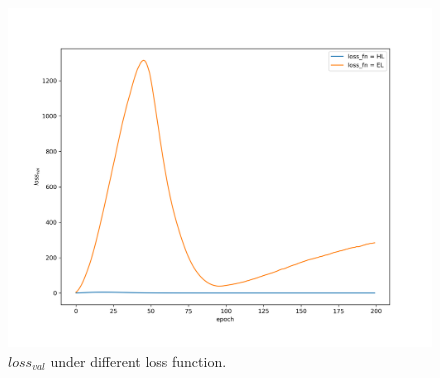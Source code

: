 \documentclass[journal, a4paper]{IEEEtran}
\begin{document}
\begin{figure}[!hbt]
	\begin{center}
		\includegraphics[width=\columnwidth]{l_val_loss}
		\caption{$loss_{val}$ under different loss function.}
		\label{fig:l_val_loss}
	\end{center}
\end{figure} \par
\end{document}
